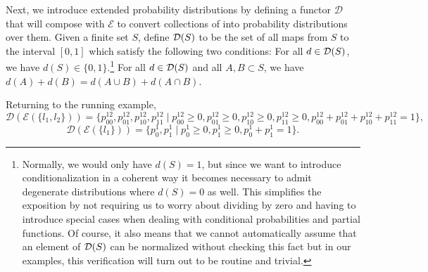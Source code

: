 Next, we introduce extended probability distributions by defining a functor $\mathcal{D}$ that will compose with $\mathcal{E}$ to convert collections of \gnpm{} into probability distributions over them.  Given a finite set $S$, define $\mathcal{D}(S)$ to be the set of all maps from $S$ to the interval $[0,1]$ which satisfy the following two conditions:  For all $d \in \mathcal{D}(S)$, we have $d(S) \in \{0,1\}$.\footnote{Normally, we would only have $d(S) = 1$, but since we want to introduce conditionalization in a coherent way it becomes necessary to admit degenerate distributions where $d(S) = 0$ as well. This simplifies the exposition by not requiring us to worry about dividing by zero and having to introduce special cases when dealing with conditional probabilities and partial functions.  Of course, it also means that we cannot automatically assume that an element of $\mathcal{D}(S)$ can be normalized without checking this fact but in our examples, this verification will turn out to be routine and trivial.}  For all  $d \in \mathcal{D}(S)$ and all $A, B \subset S$, we have $d(A) + d(B) = d(A \cup B) + d(A \cap B)$.

Returning to the running example,
$$\mathcal{D}(\mathcal{E}(\{l_1,l_2\})) = \{p^{12}_{00},p^{12}_{01},p^{12}_{10},p^{12}_{11} \mid p^{12}_{00} \geq 0, p^{12}_{01} \geq 0,p^{12}_{10} \geq 0,p^{12}_{11} \geq 0, p^{12}_{00} + p^{12}_{01} + p^{12}_{10} + p^{12}_{11} = 1 \},$$
$$\mathcal{D}(\mathcal{E}(\{l_1\})) = \{p^{1}_{0}, p^{1}_{1} \mid p^{1}_{0} \geq 0, p^{1}_{1} \geq 0, p^{1}_{0}+p^{1}_{1} = 1 \}.$$

